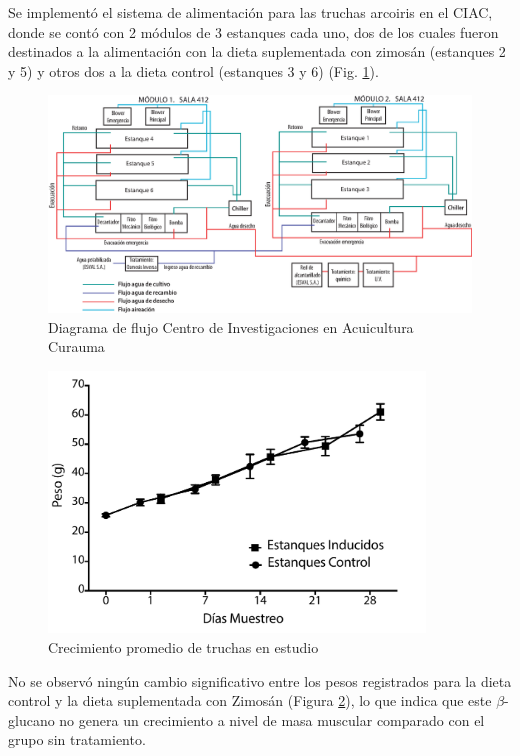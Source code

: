 \documentclass[12pt,letterpaper,oneside]{scrbook}
\begin{document}
Se implementó el sistema de alimentación para las truchas arcoiris en el
CIAC, donde se contó con 2 módulos de 3 estanques cada uno, dos de los
cuales fueron destinados a la alimentación con la dieta suplementada con
zimosán (estanques 2 y 5) y otros dos a la dieta control (estanques 3 y
6) (Fig. \ref{fig:ciac}).

\begin{figure}[h!]
    \centering
    \includegraphics[width=1\textwidth]{ciac}
    \caption {Diagrama de flujo Centro de Investigaciones en Acuicultura Curauma}
    \label {fig:ciac}
\end{figure}

\begin{figure}[h!]
    \centering
    \includegraphics[width=10cm]{peso}
    \caption {Crecimiento promedio de truchas en estudio}
    \label {fig:pesos}
\end{figure}

No se observó ningún cambio significativo entre los pesos registrados
para la dieta control y la dieta suplementada con Zimosán (Figura
\ref{fig:pesos}), lo que indica que este \(\beta\)-glucano no genera un
crecimiento a nivel de masa muscular comparado con el grupo sin
tratamiento.
\end{document}
